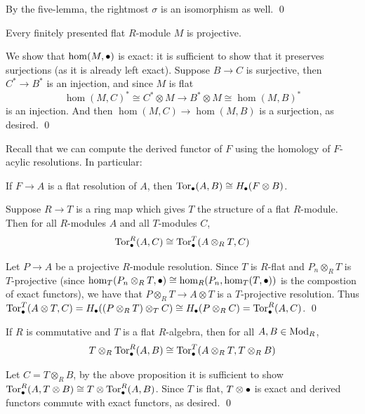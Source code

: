     By the five-lemma, the rightmost $\sigma$ is an isomorphism as well.
    \qed

\eproof

\bthrm

    Every finitely presented flat $R$-module $M$ is projective.

\ethrm

\bproof

    We show that $\hom(M,\bullet)$ is exact: it is sufficient to show that it preserves surjections (as it is already left exact).
    Suppose $B\to C$ is surjective, then $C^*\to B^*$ is an injection, and since $M$ is flat
    $$ \hom(M,C)^* \cong C^*\otimes M \to B^*\otimes M \cong \hom(M,B)^* $$
    is an injection.
    And then $\hom(M,C)\to\hom(M,B)$ is a surjection, as desired.
    \qed

\eproof

Recall that we can compute the derived functor of $F$ using the homology of $F$-acylic resolutions.
In particular:

\bthrm

    If $F\to A$ is a flat resolution of $A$, then ${\rm Tor}_\bullet(A,B)\cong H_\bullet(F\otimes B)$.

\ethrm

\bprop

    Suppose $R\to T$ is a ring map which gives $T$ the structure of a flat $R$-module.
    Then for all $R$-modules $A$ and all $T$-modules $C$,
    $$ {\rm Tor}^R_\bullet(A,C) \cong {\rm Tor}^T_\bullet(A\otimes_RT,C) $$

\eprop

\bproof

    Let $P\to A$ be a projective $R$-module resolution.
    Since $T$ is $R$-flat and $P_n\otimes_RT$ is $T$-projective (since $\hom_T(P_n\otimes_RT,\bullet)\cong\hom_R(P_n,\hom_T(T,\bullet))$ is the compostion of exact functors),
    we have that $P\otimes_RT\to A\otimes T$ is a $T$-projective resolution.
    Thus ${\rm Tor}^T_\bullet(A\otimes T,C)=H_\bullet((P\otimes_RT)\otimes_TC)\cong H_\bullet(P\otimes_RC)={\rm Tor}^R_\bullet(A,C)$.
    \qed

\eproof

\bcoro

    If $R$ is commutative and $T$ is a flat $R$-algebra, then for all $A,B\in{\rm Mod}_R$,
    $$ T\otimes_R{\rm Tor}^R_\bullet(A,B) \cong {\rm Tor}^T_\bullet(A\otimes_RT,T\otimes_RB) $$

\ecoro

\bproof

    Let $C=T\otimes_RB$, by the above proposition it is sufficient to show ${\rm Tor}^R_\bullet(A,T\otimes B)\cong T\otimes{\rm Tor}^R_\bullet(A,B)$.
    Since $T$ is flat, $T\otimes\bullet$ is exact and derived functors commute with exact functors, as desired.
    \qed


